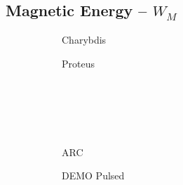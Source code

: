 \clearpage

\newpage

\subsection*{ Magnetic Energy -- $W_M$ }
  \label{subsection:scan_W_M}

\begin{figure*}[h!]
    \centering
    \hfill
    \begin{subfigure}[t]{0.45\textwidth}
        \centering
    \begin{adjustbox}{width=\textwidth}
      \Large
      
    \end{adjustbox}
        \caption{Charybdis}
    \end{subfigure}
    \hfill
    \begin{subfigure}[t]{0.45\textwidth}
        \centering
    \begin{adjustbox}{width=\textwidth}
      \Large
      
    \end{adjustbox}
        \caption{Proteus}
    \end{subfigure}
    \hfill \hfill ~\\ ~\\ ~\\ ~\\
    \hfill
    \begin{subfigure}[t]{0.45\textwidth}
        \centering
    \begin{adjustbox}{width=\textwidth}
      \Large
      
    \end{adjustbox}
        \caption{ARC}
    \end{subfigure}
    \hfill
    \begin{subfigure}[t]{0.45\textwidth}
        \centering
    \begin{adjustbox}{width=\textwidth}
      \Large
      
    \end{adjustbox}
        \caption{DEMO Pulsed}
    \end{subfigure}
    \hfill \hfill ~\\ ~\\ ~\\ ~\\
    \hfill
    \begin{subfigure}[t]{0.45\textwidth}
        \centering
    \begin{adjustbox}{width=\textwidth}

\end{adjustbox}
\end{subfigure}
\end{figure*}
